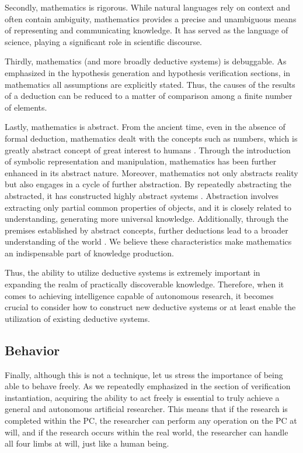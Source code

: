 Secondly, mathematics is rigorous. While natural languages rely on context and often contain ambiguity, mathematics provides a precise and unambiguous means of representing and communicating knowledge. It has served as the language of science, playing a significant role in scientific discourse.

Thirdly, mathematics (and more broadly deductive systems) is debuggable. As emphasized in the hypothesis generation and hypothesis verification sections, in mathematics all assumptions are explicitly stated. Thus, the causes of the results of a deduction can be reduced to a matter of comparison among a finite number of elements.

Lastly, mathematics is abstract. From the ancient time, even in the absence of formal deduction, mathematics dealt with the concepts such as numbers, which is greatly abstract concept of great interest to humans \cite{david2010history}. Through the introduction of symbolic representation and manipulation, mathematics has been further enhanced in its abstract nature. Moreover, mathematics not only abstracts reality but also engages in a cycle of further abstraction. By repeatedly abstracting the abstracted, it has constructed highly abstract systems \cite{bochner1966role}. Abstraction involves extracting only partial common properties of objects, and it is closely related to understanding, generating more universal knowledge. Additionally, through the premises established by abstract concepts, further deductions lead to a broader understanding of the world \cite{heisenberg2008abstraction}. We believe these characteristics make mathematics an indispensable part of knowledge production. 

Thus, the ability to utilize deductive systems is extremely important in expanding the realm of practically discoverable knowledge. Therefore, when it comes to achieving intelligence capable of autonomous research, it becomes crucial to consider how to construct new deductive systems or at least enable the utilization of existing deductive systems.

\subsection{Behavior}
Finally, although this is not a technique, let us stress the importance of being able to behave freely. As we repeatedly emphasized in the section of verification instantiation, acquiring the ability to act freely is essential to truly achieve a general and autonomous artificial researcher. This means that if the research is completed within the PC, the researcher can perform any operation on the PC at will, and if the research occurs within the real world, the researcher can handle all four limbs at will, just like a human being.

